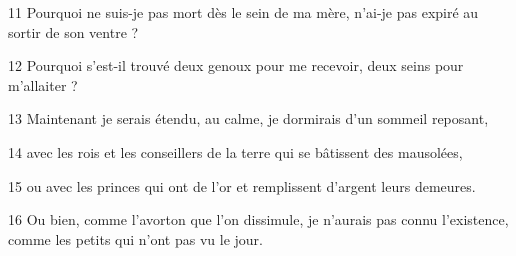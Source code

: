 
11 Pourquoi ne suis-je pas mort dès le sein de ma mère, n’ai-je pas expiré au sortir de son ventre ?

12 Pourquoi s’est-il trouvé deux genoux pour me recevoir, deux seins pour m’allaiter ?

13 Maintenant je serais étendu, au calme, je dormirais d’un sommeil reposant,

14 avec les rois et les conseillers de la terre qui se bâtissent des mausolées,

15 ou avec les princes qui ont de l’or et remplissent d’argent leurs demeures.

16 Ou bien, comme l’avorton que l’on dissimule, je n’aurais pas connu l’existence, comme les petits qui n’ont pas vu le jour.